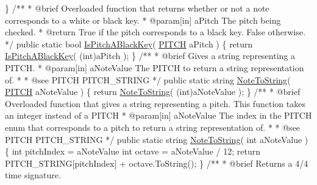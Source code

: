 \begin{DoxyCodeInclude}
    \}
\textcolor{comment}{}
\textcolor{comment}{    /** }
\textcolor{comment}{     * @brief Overloaded function that returns whether or not a note corresponds to a white or black key.}
\textcolor{comment}{     * @param[in] aPitch The pitch being checked.}
\textcolor{comment}{     * @return True if the pitch corresponds to a black key. False otherwise.}
\textcolor{comment}{    */}
    \textcolor{keyword}{public} \textcolor{keyword}{static} \textcolor{keywordtype}{bool} \hyperlink{group___music_stat_func_gacc2c1a66df7197225f61c5737f794065}{IsPitchABlackKey}( \hyperlink{group___music_enums_ga508f69b199ea518f935486c990edac1d}{PITCH} aPitch )
    \{
        \textcolor{keywordflow}{return} \hyperlink{group___music_stat_func_gacc2c1a66df7197225f61c5737f794065}{IsPitchABlackKey}( (\textcolor{keywordtype}{int})aPitch );
    \}
\textcolor{comment}{}
\textcolor{comment}{    /**}
\textcolor{comment}{     * @brief Gives a string representing a PITCH.}
\textcolor{comment}{     * @param[in] aNoteValue The PITCH to return a string representation of.}
\textcolor{comment}{     * }
\textcolor{comment}{     * @see PITCH PITCH\_STRING}
\textcolor{comment}{    */} 
    \textcolor{keyword}{public} \textcolor{keyword}{static} \textcolor{keywordtype}{string} \hyperlink{group___music_stat_func_ga85a22c905d56d4c5f4e62159bfecee8c}{NoteToString}( \hyperlink{group___music_enums_ga508f69b199ea518f935486c990edac1d}{PITCH} aNoteValue )
    \{
        \textcolor{keywordflow}{return} \hyperlink{group___music_stat_func_ga85a22c905d56d4c5f4e62159bfecee8c}{NoteToString}( (\textcolor{keywordtype}{int})aNoteValue );
    \}
\textcolor{comment}{}
\textcolor{comment}{    /**}
\textcolor{comment}{     * @brief Overloaded function that gives a string representing a pitch. This function takes an integer
       instead of a PITCH}
\textcolor{comment}{     * @param[in] aNoteValue The index in the PITCH enum that corresponds to a pitch to return a string
       representation of.}
\textcolor{comment}{     * }
\textcolor{comment}{     * @see PITCH PITCH\_STRING}
\textcolor{comment}{    */}
    \textcolor{keyword}{public} \textcolor{keyword}{static} \textcolor{keywordtype}{string} \hyperlink{group___music_stat_func_ga85a22c905d56d4c5f4e62159bfecee8c}{NoteToString}( \textcolor{keywordtype}{int} aNoteValue )
    \{
        \textcolor{keywordtype}{int} pitchIndex = aNoteValue %
        \textcolor{keywordtype}{int} octave = aNoteValue / 12;
        \textcolor{keywordflow}{return} PITCH\_STRING[pitchIndex] + octave.ToString();
    \}
\textcolor{comment}{}
\textcolor{comment}{    /**}
\textcolor{comment}{     * @brief Returns a 4/4 time signature.}

\end{DoxyCodeInclude}

